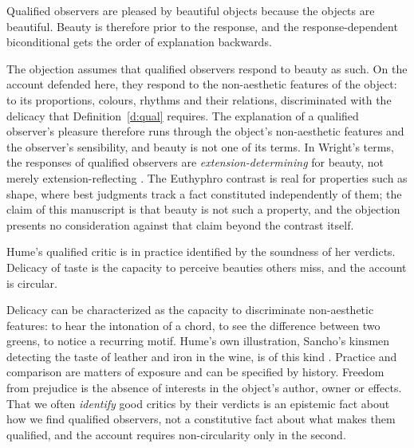 \documentclass{situationist-preprint}
\begin{document}
\begin{objection}[Euthyphro]\label{o:euth}
Qualified observers are pleased by beautiful objects because the objects are beautiful. Beauty is therefore prior to the response, and the response-dependent biconditional gets the order of explanation backwards.
\end{objection}

\begin{reply}
The objection assumes that qualified observers respond to beauty as such. On the account defended here, they respond to the non-aesthetic features of the object: to its proportions, colours, rhythms and their relations, discriminated with the delicacy that Definition~\ref{d:qual} requires. The explanation of a qualified observer's pleasure therefore runs through the object's non-aesthetic features and the observer's sensibility, and beauty is not one of its terms. In Wright's terms, the responses of qualified observers are \emph{extension-determining} for beauty, not merely extension-reflecting \citep{Wright1992}. The Euthyphro contrast is real for properties such as shape, where best judgments track a fact constituted independently of them; the claim of this manuscript is that beauty is not such a property, and the objection presents no consideration against that claim beyond the contrast itself.
\end{reply}

\begin{objection}[Circularity]\label{o:circ}
Hume's qualified critic is in practice identified by the soundness of her verdicts. Delicacy of taste is the capacity to perceive beauties others miss, and the account is circular.
\end{objection}

\begin{reply}
Delicacy can be characterized as the capacity to discriminate non-aesthetic features: to hear the intonation of a chord, to see the difference between two greens, to notice a recurring motif. Hume's own illustration, Sancho's kinsmen detecting the taste of leather and iron in the wine, is of this kind \citep{Hume1757}. Practice and comparison are matters of exposure and can be specified by history. Freedom from prejudice is the absence of interests in the object's author, owner or effects. That we often \emph{identify} good critics by their verdicts is an epistemic fact about how we find qualified observers, not a constitutive fact about what makes them qualified, and the account requires non-circularity only in the second.
\end{reply}
\end{document}
